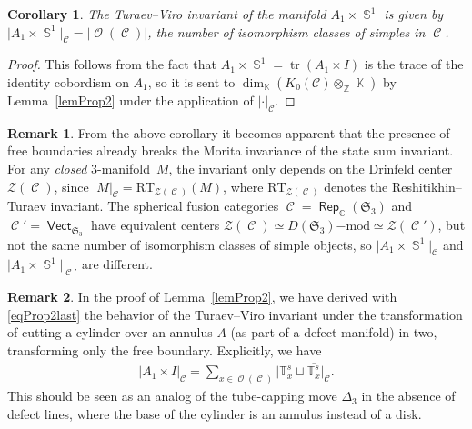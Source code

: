 \documentclass[pdftex]{sigma}
\DeclareMathOperator{\tr}{tr}
\DeclareMathOperator{\vect}{\mathsf{Vect}}
\DeclareMathOperator{\Rep}{\mathsf{Rep}}
\DeclareMathOperator{\K}{\mathbb{K}}
\DeclareMathOperator{\C}{\mathbb{C}}
\DeclareMathOperator{\Sp}{\mathbb{S}}
\DeclareMathOperator{\calc}{\mathcal{C}}
\DeclareMathOperator{\calo}{\mathcal{O}}
\numberwithin{equation}{section}
\newtheorem{Corollary}[Corollary]{Corollary}
\theoremstyle{definition}
\newtheorem{Remark}[Remark]{Remark}
\begin{document}
\begin{Corollary}\label{corAnn}
The Turaev--Viro invariant of the manifold $A_1 \times \Sp^1$ is given by $\bigl|{A_1 \times \Sp^1}\bigr|_{\calc} = |{\calo}(\calc)|$, the number of isomorphism classes of simples in $\calc$.
\end{Corollary}
\begin{proof}
 This follows from the fact that $A_1 \times \Sp^1 = \tr(A_1 \times I)$ is the trace of the identity cobordism on $A_1$, so it is sent to $\dim_{\K}(K_0(\mathcal{C}) \otimes_{\mathbb{Z}} \K)$ by Lemma~\ref{lemProp2} under the application of $|\cdot|_{\calc}$.
\end{proof}
\begin{Remark}
 From the above corollary it becomes apparent that the presence of free boundaries already breaks the Morita invariance of the state sum invariant. For any \textit{closed} 3-mani\-fold~$M$, the invariant only depends on the Drinfeld center $\mathcal{Z}(\calc)$, since $|M|_{\calc} = \mathrm{RT}_{\mathcal{Z}(\calc)}(M)$, where $\mathrm{RT}_{\mathcal{Z}(\calc)}$ denotes the Reshitikhin--Turaev invariant. The spherical fusion categories $\calc = \Rep_{\C}(\mathfrak{S}_3)$ and $\calc' = \vect_{\mathfrak{S}_3}$ have equivalent centers $\mathcal{Z}(\calc) \simeq D(\mathfrak{S}_3)\mathrm{-mod}\simeq \mathcal{Z}(\calc')$, but not the same number of isomorphism classes of simple objects, so $\bigl|A_1 \times \Sp^1\bigr|_{\calc}$ and $\bigl|A_1 \times \Sp^1\bigr|_{\calc'}$ are different.
\end{Remark}
\begin{Remark}
 In the proof of Lemma~\ref{lemProp2}, we have derived with \eqref{eqProp2last} the behavior of the Turaev--Viro invariant under the transformation of cutting a cylinder over an annulus $A$ (as part of a defect manifold) in two, transforming only the free boundary. Explicitly, we have
 \begin{align}
 \label{eqAnnCut}
 |A_1 \times I|_{\calc} = \sum_{x \in \calo(\calc)} \bigl|\mathbb{T}_x^s \sqcup \overline{\mathbb{T}_x^s}\bigr|_{\calc}.
 \end{align}
 This should be seen as an analog of the tube-capping move $\Delta_3$ in the absence of defect lines, where the base of the cylinder is an annulus instead of a disk.
\end{Remark}
\end{document}
